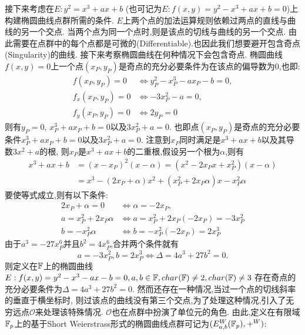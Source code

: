 接下来考虑在$E:  y^2 = x^3 + ax + b$ (也可记为$E: f(x,y) = y^2 - x^3 + ax + b = 0$)上构建椭圆曲线点群所需的条件.
$E$上两个点的加法运算规则依赖过两点的直线与曲线的另一个交点.
当两个点为同一个点时,则是该点的切线与曲线的另一个交点.
由此需要在点群中的每个点都是可微的(Diﬀerentiable).也因此我们想要避开包含奇点(Singularity)的曲线.
接下来考察椭圆曲线在何种情况下会包含奇点.
椭圆曲线$f(x,y) = 0$上一个点$(x_P,y_P)$是奇点的充分必要条件为在该点的偏导数为0,也即:
\begin{equation*}
\begin{split}
f(x_P, y_P) = 0 & \iff y_P^2 - x_P^3 - ax_P - b = 0, \\
 f_x(x_P, y_P) = 0 & \iff  -3x_P^2 - a = 0, \\
 f_y(x_P, y_P) = 0 & \iff 2y_P  = 0
\end{split}
\end{equation*}
则有$y_P = 0$, $x_P^3 + ax_P + b = 0$以及$3x_P^2 + a = 0$.
也即点$(x_P,y_P)$是奇点的充分必要条件$x_P^3 + ax_P + b = 0$以及$3x_P^2 + a = 0$.
注意到$x_P$同时满足是$x^3 + ax + b$以及其导数$3x^2 + a$的根,
则$x_P$是$x^3 + ax + b$的二重根,假设另一个根为$\alpha$,则有
\begin{equation*}
\begin{split}
x^3 + ax + b & = (x-x_P)^2(x-\alpha) = (x^2 -2x_Px + x_P^2)(x-\alpha)\\
 & = x^3 - (2x_P + \alpha)x^2 + (x_P^2 + 2x_P\alpha)x - x_P^2\alpha
\end{split}
\end{equation*}
要使等式成立,则有以下条件:
\begin{equation*}
\begin{split}
2x_P + \alpha = 0 & \iff \alpha = -2x_P, \\
a = x_P^2 + 2x_P\alpha & \iff a = x_P^2 + 2x_P(-2x_P) = -3x_P^2\\
b = - x_P^2\alpha & \iff b = -x_P^2(-2x_P) = 2x_P^3
\end{split}
\end{equation*}
由于$a^3 = -27x_P^6$并且$b^2 = 4x_P^6$,合并两个条件就有
$$
a  = -3x_P^2, b = 2x_P^3 \iff  \Delta = 4a^3 + 27b^2 = 0.
$$
则定义在$\mathbb{F}$上的椭圆曲线$E: f(x,y) = y^2 - x^3 - ax - b = 0, a, b \in \mathbb{F}, char(\mathbb{F})\neq 2, char(\mathbb{F})\neq 3$
存在奇点的充分必要条件为$\Delta = 4a^3 + 27b^2 = 0$.
然而还存在一种情况,当过一个点的切线斜率的垂直于横坐标时,
则过该点的曲线没有第三个交点,为了处理这种情况,引入了无穷远点$\mathcal{O}$来处理该特殊情况.
$\mathcal{O}$也在点群中扮演了单位元的角色.
由此,定义在有限域$\mathbb{F}_p$上的基于Short Weierstrass形式的椭圆曲线点群可记为$(E_{a,b}^{W}(\mathbb{F}_p), +^W)$:
